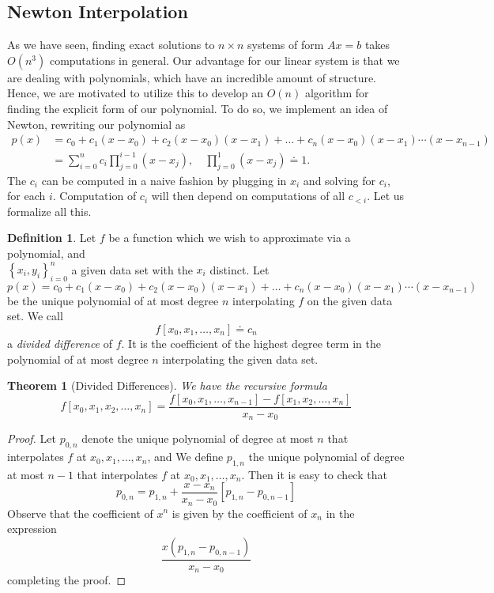 \documentclass[12pt]{article}
\theoremstyle{plain}
\newtheorem{theorem}{Theorem}
\theoremstyle{definition}
\newtheorem*{definition}{Definition}
\theoremstyle{remark}
\numberwithin{equation}{section}  %
\begin{document}
\subsection{Newton Interpolation}
As we have seen, finding exact solutions to $n \times n$
systems of form $Ax = b$ takes $O(n^3)$ computations in general.
Our advantage for our linear system is that we are dealing with polynomials,
which have an incredible amount of structure. Hence, we are motivated
to utilize this to develop an $O(n)$ algorithm for finding the explicit
form of our polynomial. 
To do so, we implement an idea of Newton, rewriting our polynomial as
\begin{align*}
p(x) &= c_0 + c_1(x - x_0) + c_2(x - x_0)(x - x_1) + \ldots
+ c_{n}(x - x_0)(x - x_1)\cdots(x - x_{n-1})
\\
& = \sum_{i=0}^{n} c_i \prod_{j=0}^{i-1} (x - x_j), \quad \prod_{j=0}^{1} (x - x_j) \doteq 1.
\end{align*}
The $c_i$ can be computed in a naive fashion by plugging in $x_i$ 
and solving for $c_i$, for each $i$. Computation of $c_i$ will then depend
on computations of all $c_{< i}$. Let us formalize all this. 
\begin{definition}
Let $f$ be a function which we wish to approximate via a polynomial,
and \\ $ \left\{ x_i, y_i \right\}_{i=0}^{n} $ a given data set with the
$x_i$ distinct. Let
\begin{equation*}
p(x) = c_0 + c_1(x - x_0) + c_2(x - x_0)(x - x_1) + \ldots
+ c_{n}(x - x_0)(x - x_1)\cdots(x - x_{n-1})
\end{equation*}
be the unique polynomial of at most degree $n$ interpolating $f$
on the given data set. We call
\begin{equation*}
f[x_0, x_1, \ldots, x_n] \doteq c_n
\end{equation*}
a \emph{divided difference} of $f$. It is the coefficient of the
highest degree term in the polynomial of at most degree $n$ interpolating the
given data set. 
\end{definition}
\begin{theorem}[Divided Differences]
We have the recursive formula
\begin{equation*}
f[x_0, x_1, x_2, \ldots, x_n] = \frac{f[x_0, x_1, \ldots, x_{n-1}] - f[x_1, x_2, \ldots, x_n]}{x_n - x_0}
\end{equation*}
\end{theorem}
\begin{proof}
Let $p_{0,n}$ denote the unique polynomial of degree at most $n$ that
interpolates $f$ at $x_0, x_1, \ldots, x_n$, and  We define
$p_{1,n}$ the unique polynomial of degree at most $n-1$ that interpolates
$f$ at $x_0, x_1, \ldots, x_n$. Then it is easy to check that
\begin{equation*}
p_{0,n} = p_{1,n} + \frac{x - x_n}{x_n - x_0}[p_{1,n} - p_{0,n-1}]
\end{equation*}
Observe that the coefficient of $x^n$ is given by the coefficient of $x_n$ in the expression 
\begin{equation*}
\frac{x(p_{1,n} - p_{0,n-1})}{x_n - x_0}
\end{equation*}
completing the proof.
\end{proof}
\end{document}
